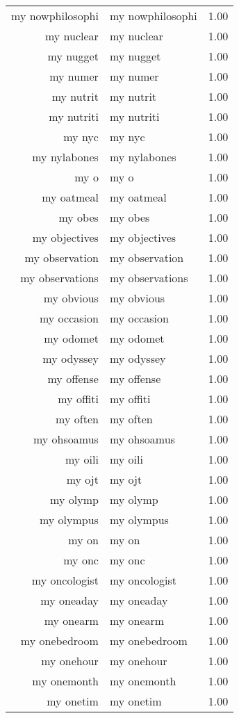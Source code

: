 \begin{table}[ht]
\begin{tabular}{rlr}
  my nowphilosophi & my nowphilosophi & 1.00 \\ 
  my nuclear & my nuclear & 1.00 \\ 
  my nugget & my nugget & 1.00 \\ 
  my numer & my numer & 1.00 \\ 
  my nutrit & my nutrit & 1.00 \\ 
  my nutriti & my nutriti & 1.00 \\ 
  my nyc & my nyc & 1.00 \\ 
  my nylabones & my nylabones & 1.00 \\ 
  my o & my o & 1.00 \\ 
  my oatmeal & my oatmeal & 1.00 \\ 
  my obes & my obes & 1.00 \\ 
  my objectives & my objectives & 1.00 \\ 
  my observation & my observation & 1.00 \\ 
  my observations & my observations & 1.00 \\ 
  my obvious & my obvious & 1.00 \\ 
  my occasion & my occasion & 1.00 \\ 
  my odomet & my odomet & 1.00 \\ 
  my odyssey & my odyssey & 1.00 \\ 
  my offense & my offense & 1.00 \\ 
  my offiti & my offiti & 1.00 \\ 
  my often & my often & 1.00 \\ 
  my ohsoamus & my ohsoamus & 1.00 \\ 
  my oili & my oili & 1.00 \\ 
  my ojt & my ojt & 1.00 \\ 
  my olymp & my olymp & 1.00 \\ 
  my olympus & my olympus & 1.00 \\ 
  my on & my on & 1.00 \\ 
  my onc & my onc & 1.00 \\ 
  my oncologist & my oncologist & 1.00 \\ 
  my oneaday & my oneaday & 1.00 \\ 
  my onearm & my onearm & 1.00 \\ 
  my onebedroom & my onebedroom & 1.00 \\ 
  my onehour & my onehour & 1.00 \\ 
  my onemonth & my onemonth & 1.00 \\ 
  my onetim & my onetim & 1.00 \\ 

\end{tabular}
\end{table}
